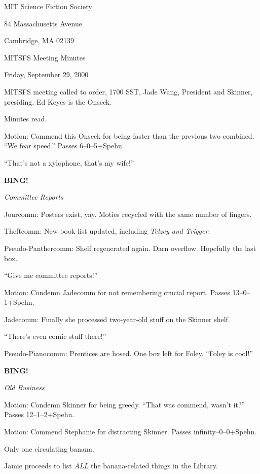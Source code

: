 \documentclass[12pt]{article}
\newcommand{\bing}{{\bf BING!} }
\newcommand{\goto}[1]{\bing \vskip 12pt \centerline{{\em{#1}}}}
\begin{document}
\begin{center}

MIT Science Fiction Society 

84 Massachusetts Avenue

Cambridge, MA 02139

\vspace{12pt}

MITSFS Meeting Minutes 

Friday, September 29, 2000

\end{center}
 
\vspace{18pt}

\setlength{\parskip}{6pt}

\noindent
MITSFS meeting called to order, 1700 SST, Jade Wang, President and
Skinner, presiding.  Ed Keyes is the Onseck.

Minutes read.

Motion: Commend this Onseck for being faster than the previous two
combined.  ``We fear speed.''  Passes 6--0--5+Spehn.

``That's not a xylophone, that's my wife!''

\goto{Committee Reports}

Jourcomm: Posters exist, yay.  Moties recycled with the same number
of fingers.

Theftcomm: New book list updated, including {\em Telzey and Trigger}.

Pseudo-Panthercomm: Shelf regenerated again.  Darn overflow.
Hopefully the last box.

``Give me committee reports!''

Motion: Condemn Jadecomm for not remembering crucial report.  Passes
13--0--1+Spehn.

Jadecomm: Finally she processed two-year-old stuff on the Skinner
shelf.

``There's even comic stuff there!''

Pseudo-Pianocomm: Prentices are hosed.  One box left for Foley.
``Foley is cool!''

\goto{Old Business}

Motion: Condemn Skinner for being greedy.  ``That was commend,
wasn't it?''  Passes 12--1--2+Spehn.

Motion: Commend Stephanie for distracting Skinner.  Passes
infinity--0--0+Spehn.

Only one circulating banana.

Jamie proceeds to list {\em ALL} the banana-related things in the
Library.
\end{document}
